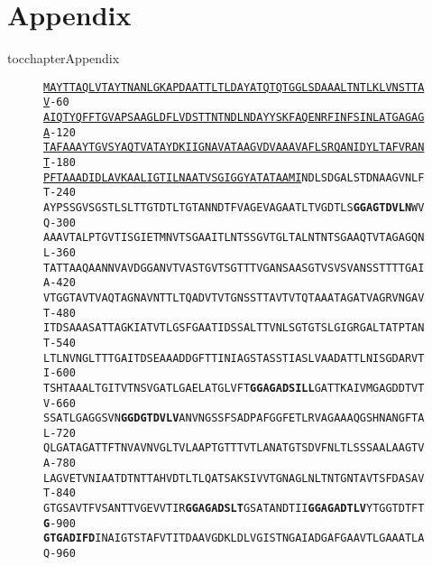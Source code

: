 \chapter*{Appendix}
\renewcommand{\thechapter}


\addcontentsline{toc}{chapter}{Appendix}
\setcounter{figure}{0}
\renewcommand{\thefigure}{A.\arabic{figure}}
\begin{figure}[htb]
  	\begin{center}
\label{app:rsaseq}
\texttt{\singlespacing\small\underline{MAYTTAQLVTAYTNANLGKAPDAATTLTLDAYATQTQTGGLSDAAALTNTLKLVNSTTAV}\hfill-60~~\\
\underline{AIQTYQFFTGVAPSAAGLDFLVDSTTNTNDLNDAYYSKFAQENRFINFSINLATGAGAGA}\hfill-120~\\
\underline{TAFAAAYTGVSYAQTVATAYDKIIGNAVATAAGVDVAAAVAFLSRQANIDYLTAFVRANT}\hfill-180~\\
\underline{PFTAAADIDLAVKAALIGTILNAATVSGIGGYATATAAMI}NDLSDGALSTDNAAGVNLFT\hfill-240~\\
AYPSSGVSGSTLSLTTGTDTLTGTANNDTFVAGEVAGAATLTVGDTLS\textbf{GGAGTDVLN}WVQ\hfill-300~\\
AAAVTALPTGVTISGIETMNVTSGAAITLNTSSGVTGLTALNTNTSGAAQTVTAGAGQNL\hfill-360~\\
TATTAAQAANNVAVDGGANVTVASTGVTSGTTTVGANSAASGTVSVSVANSSTTTTGAIA\hfill-420~\\
VTGGTAVTVAQTAGNAVNTTLTQADVTVTGNSSTTAVTVTQTAAATAGATVAGRVNGAVT\hfill-480~\\
ITDSAAASATTAGKIATVTLGSFGAATIDSSALTTVNLSGTGTSLGIGRGALTATPTANT\hfill-540~\\
LTLNVNGLTTTGAITDSEAAADDGFTTINIAGSTASSTIASLVAADATTLNISGDARVTI\hfill-600~\\
TSHTAAALTGITVTNSVGATLGAELATGLVFT\textbf{GGAGADSILL}GATTKAIVMGAGDDTVTV\hfill-660~\\
SSATLGAGGSVN\textbf{GGDGTDVLV}ANVNGSSFSADPAFGGFETLRVAGAAAQGSHNANGFTAL\hfill-720~\\
QLGATAGATTFTNVAVNVGLTVLAAPTGTTTVTLANATGTSDVFNLTLSSSAALAAGTVA\hfill-780~\\
LAGVETVNIAATDTNTTAHVDTLTLQATSAKSIVVTGNAGLNLTNTGNTAVTSFDASAVT\hfill-840~\\
GTGSAVTFVSANTTVGEVVTIR\textbf{GGAGADSLT}GSATANDTII\textbf{GGAGADTLV}YTGGTDTFT\textbf{G}\hfill-900~\\
\textbf{GTGADIFD}INAIGTSTAFVTITDAAVGDKLDLVGISTNGAIADGAFGAAVTLGAAATLAQ\hfill-960~\\
}
\end{center}
\end{figure}
